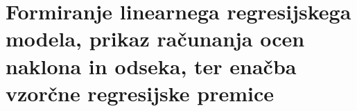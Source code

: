 \section{Formiranje linearnega regresijskega modela, prikaz računanja ocen naklona in odseka, ter enačba vzorčne regresijske premice}